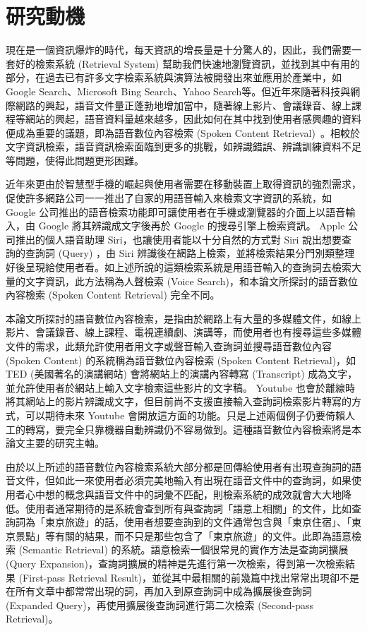 \section{研究動機}
現在是一個資訊爆炸的時代，每天資訊的增長量是十分驚人的，因此，我們需要一套好的檢索系統 (Retrieval System) 幫助我們快速地瀏覽資訊，並找到其中有用的部分，在過去已有許多文字檢索系統與演算法被開發出來並應用於產業中，如 Google Search、Microsoft Bing Search、Yahoo
Search等。但近年來隨著科技與網際網路的興起，語音文件量正蓬勃地增加當中，隨著線上影片、會議錄音、線上課程等網站的興起，語音資料量越來越多，因此如何在其中找到使用者感興趣的資料便成為重要的議題，即為語音數位內容檢索 (Spoken Content Retrieval)~\cite{chelba2008retrieval, lee2005spoken}。相較於文字資訊檢索，語音資訊檢索面臨到更多的挑戰，如辨識錯誤、辨識訓練資料不足等問題，使得此問題更形困難。

近年來更由於智慧型手機的崛起與使用者需要在移動裝置上取得資訊的強烈需求，促使許多網路公司一一推出了自家的用語音輸入來檢索文字資訊的系統，如 Google 公司推出的語音檢索功能即可讓使用者在手機或瀏覽器的介面上以語音輸入，由 Google 將其辨識成文字後再於 Google 的搜尋引擎上檢索資訊。 Apple 公司推出的個人語音助理 Siri，也讓使用者能以十分自然的方式對 Siri 說出想要查詢的查詢詞 (Query) ，由 Siri 辨識後在網路上檢索，並將檢索結果分門別類整理好後呈現給使用者看。如上述所說的這類檢索系統是用語音輸入的查詢詞去檢索大量的文字資訊，此方法稱為人聲檢索 (Voice Search)，和本論文所探討的語音數位內容檢索 (Spoken Content Retrieval) 完全不同。

本論文所探討的語音數位內容檢索，是指由於網路上有大量的多媒體文件，如線上影片、會議錄音、線上課程、電視連續劇、演講等，而使用者也有搜尋這些多媒體文件的需求，此類允許使用者用文字或聲音輸入查詢詞並搜尋語音數位內容 (Spoken Content) 的系統稱為語音數位內容檢索 (Spoken Content Retrieval)，如 TED (美國著名的演講網站) 會將網站上的演講內容轉寫 (Transcript) 成為文字，並允許使用者於網站上輸入文字檢索這些影片的文字稿。 Youtube 也會於離線時將其網站上的影片辨識成文字，但目前尚不支援直接輸入查詢詞檢索影片轉寫的方式，可以期待未來 Youtube 會開放這方面的功能。只是上述兩個例子仍要倚賴人工的轉寫，要完全只靠機器自動辨識仍不容易做到。這種語音數位內容檢索將是本論文主要的研究主軸。

由於以上所述的語音數位內容檢索系統大部分都是回傳給使用者有出現查詢詞的語音文件，但如此一來使用者必須完美地輸入有出現在語音文件中的查詢詞，如果使用者心中想的概念與語音文件中的詞彙不匹配，則檢索系統的成效就會大大地降低。使用者通常期待的是系統會查到所有與查詢詞「語意上相關」的文件，比如查詢詞為「東京旅遊」的話，使用者想要查詢到的文件通常包含與「東京住宿」、「東京景點」等有關的結果，而不只是那些包含了「東京旅遊」的文件。此即為語意檢索 (Semantic Retrieval) 的系統。語意檢索一個很常見的實作方法是查詢詞擴展 (Query
Expansion)，查詢詞擴展的精神是先進行第一次檢索，得到第一次檢索結果 (First-pass Retrieval Result)，並從其中最相關的前幾篇中找出常常出現卻不是在所有文章中都常常出現的詞，再加入到原查詢詞中成為擴展後查詢詞 (Expanded Query)，再使用擴展後查詢詞進行第二次檢索 (Second-pass Retrieval)。

